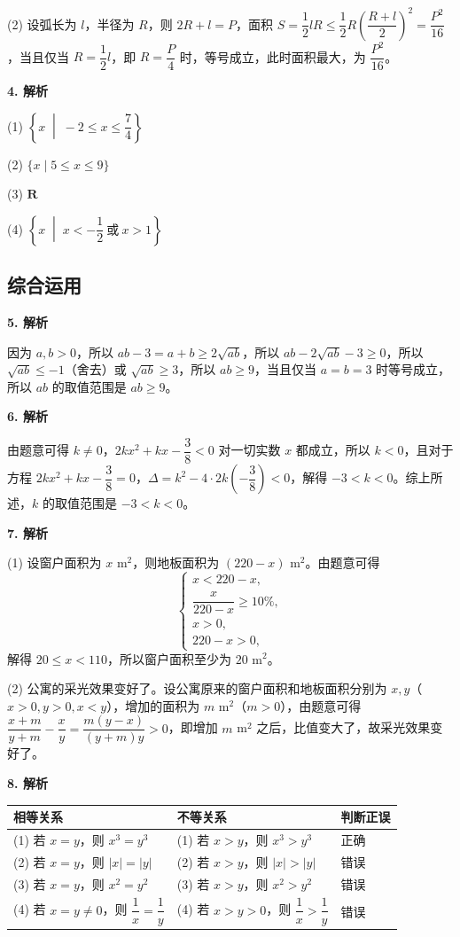 \documentclass[11pt,a4paper]{article}
\begin{document}
	(2) 设弧长为 $l$，半径为 $R$，则 $2R+l=P$，面积 $S=\dfrac{1}{2}lR\leq \dfrac{1}{2}R\left(\dfrac{R+l}{2}\right)^2=\dfrac{P^2}{16}$，当且仅当 $R=\dfrac{1}{2}l$，即 $R=\dfrac{P}{4}$ 时，等号成立，此时面积最大，为 $\dfrac{P^2}{16}$。
	
	\noindent\textbf{4. 解析}
	
	(1) $\left\{x\;\middle|\;-2\leq x\leq \dfrac{7}{4}\right\}$
	
	(2) $\{x\mid 5\leq x\leq 9\}$
	
	(3) $\mathbf{R}$
	
	(4) $\left\{x\;\middle|\;x<-\dfrac{1}{2}\ \text{或}\ x>1\right\}$
	
	\subsection*{综合运用}
	
	\noindent\textbf{5. 解析}
	
	因为 $a,b>0$，所以 $ab-3=a+b\geq 2\sqrt{ab}$，所以 $ab-2\sqrt{ab}-3\geq 0$，所以 $\sqrt{ab}\leq -1$（舍去）或 $\sqrt{ab}\geq 3$，所以 $ab\geq 9$，当且仅当 $a=b=3$ 时等号成立，所以 $ab$ 的取值范围是 $ab\geq 9$。
	
	\noindent\textbf{6. 解析}
	
	由题意可得 $k\neq 0$，$2kx^2+kx-\dfrac{3}{8}<0$ 对一切实数 $x$ 都成立，所以 $k<0$，且对于方程 $2kx^2+kx-\dfrac{3}{8}=0$，$\Delta=k^2-4\cdot 2k\left(-\dfrac{3}{8}\right)<0$，解得 $-3<k<0$。综上所述，$k$ 的取值范围是 $-3<k<0$。
	
	\noindent\textbf{7. 解析}
	
	(1) 设窗户面积为 $x$ m$^2$，则地板面积为 $(220-x)$ m$^2$。由题意可得
	\[
	\begin{cases}
		x<220-x,\\
		\dfrac{x}{220-x}\geq 10\%,\\
		x>0,\\
		220-x>0,
	\end{cases}
	\]
	解得 $20\leq x<110$，所以窗户面积至少为 $20$ m$^2$。
	
	(2) 公寓的采光效果变好了。设公寓原来的窗户面积和地板面积分别为 $x,y$（$x>0,y>0,x<y$），增加的面积为 $m$ m$^2$（$m>0$），由题意可得 $\dfrac{x+m}{y+m}-\dfrac{x}{y}=\dfrac{m(y-x)}{(y+m)y}>0$，即增加 $m$ m$^2$ 之后，比值变大了，故采光效果变好了。
	
	\noindent\textbf{8. 解析}
	
	\begin{center}
		\begin{tabular}{lll}
			\toprule
			\textbf{相等关系} & \textbf{不等关系} & \textbf{判断正误} \\
			\midrule
			(1) 若 $x=y$，则 $x^3=y^3$ & (1) 若 $x>y$，则 $x^3>y^3$ & 正确 \\
			(2) 若 $x=y$，则 $|x|=|y|$ & (2) 若 $x>y$，则 $|x|>|y|$ & 错误 \\
			(3) 若 $x=y$，则 $x^2=y^2$ & (3) 若 $x>y$，则 $x^2>y^2$ & 错误 \\
			(4) 若 $x=y\neq 0$，则 $\dfrac{1}{x}=\dfrac{1}{y}$ & (4) 若 $x>y>0$，则 $\dfrac{1}{x}>\dfrac{1}{y}$ & 错误 \\
			\bottomrule
		\end{tabular}
	\end{center}
	
\end{document}
